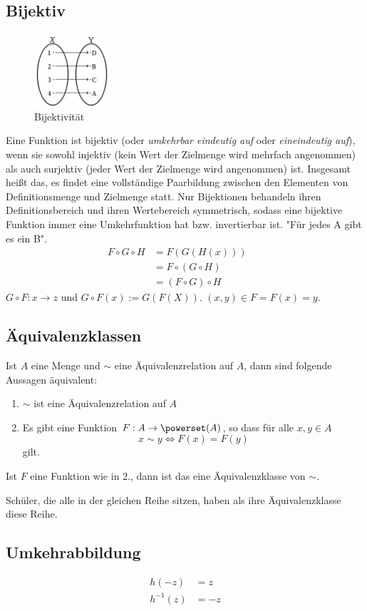 \subsection{Bijektiv}
\begin{figure}
  \vspace{-20pt}
  \begin{center}
    \includegraphics[width=0.25\textwidth]{Bilder/bijektiv}
  \end{center}
  \vspace{-20pt}
  \caption{Bijektivität}
  \vspace{-10pt}
\end{figure}
Eine Funktion ist bijektiv (oder \emph{umkehrbar eindeutig auf} oder
    \emph{eineindeutig auf}), wenn sie sowohl injektiv (kein Wert der
    Zielmenge wird mehrfach angenommen) als auch surjektiv (jeder Wert der
    Zielmenge wird angenommen) ist. Insgesamt heißt das, es findet eine
    vollständige Paarbildung zwischen den Elementen von Definitionsmenge
    und Zielmenge statt. Nur Bijektionen behandeln ihren Definitionsbereich
    und ihren Wertebereich symmetrisch, sodass eine bijektive Funktion
    immer eine Umkehrfunktion hat bzw. invertierbar ist. "Für jedes A gibt
    es ein B".
\begin{align*}
	F \circ G \circ H &= F(G(H(x))) &&\\
	&= F \circ (G \circ H) &&\\
	&= (F \circ G) \circ H &&
\end{align*}
\(G\circ F: x \rightarrow z\) und \(G \circ F(x):= G(F(X))\).\newline
\((x,y) \in F = F(x)=y\).

\subsection{Äquivalenzklassen}
Ist $A$ eine Menge und $\sim$ eine Äquivalenzrelation auf $A$, dann sind folgende Aussagen äquivalent:
\begin{enumerate}
	\item $\sim$ ist eine Äquivalenzrelation auf $A$
	\item Es gibt eine Funktion $F : A \rightarrow \powerset (A)$, so dass für alle $x, y \in A$ 
	$$x \sim y \Leftrightarrow F(x) = F(y)$$
	gilt.
\end{enumerate}
Ist $F$ eine Funktion wie in 2., dann ist das eine Äquivalenzklasse von $\sim$. 
\begin{bsp}
Schüler, die alle in der gleichen Reihe sitzen, haben als ihre Äquivalenzklasse diese Reihe.
\end{bsp}

\subsection{Umkehrabbildung}
\begin{align*}
	h(-z) &= z\\
	h^{-1}(z) &= -z	
\end{align*}